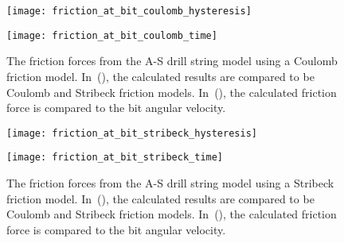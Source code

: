 \begin{figure}
	\begin{minipage}[t]{\linewidth}
		\begin{minipage}[t]{\linewidth}
			\centering
			\texttt{[image: friction\_at\_bit\_coulomb\_hysteresis]}
            \label{fig:friction_at_bit_coulomb_hysteresis}
		\end{minipage}
		\begin{minipage}[t]{\linewidth}
			\centering
			\texttt{[image: friction\_at\_bit\_coulomb\_time]}
			\label{fig:friction_at_bit_coulomb_time}
		\end{minipage}
	\end{minipage}
    \caption[The friction forces from the A-S drill string model using a Coulomb friction model]{The friction forces from the A-S drill string model using a Coulomb friction model.  In~(), the calculated results are compared to be Coulomb and Stribeck friction models.  In~(), the calculated friction force is compared to the bit angular velocity.}
    \label{fig:friction_at_bit_coulomb}
\end{figure}

\begin{figure}
	\begin{minipage}[t]{\linewidth}
		\begin{minipage}[t]{\linewidth}
			\centering
			\texttt{[image: friction\_at\_bit\_stribeck\_hysteresis]}
            \label{fig:friction_at_bit_stribeck_hysteresis}
		\end{minipage}
		\begin{minipage}[t]{\linewidth}
			\centering
			\texttt{[image: friction\_at\_bit\_stribeck\_time]}
			\label{fig:friction_at_bit_stribeck_time}
		\end{minipage}
	\end{minipage}
    \caption[The friction forces from the A-S drill string model using a Stribeck friction model]{The friction forces from the A-S drill string model using a Stribeck friction model.  In~(), the calculated results are compared to be Coulomb and Stribeck friction models.  In~(), the calculated friction force is compared to the bit angular velocity.}
    \label{fig:friction_at_bit_stribeck}
\end{figure}

